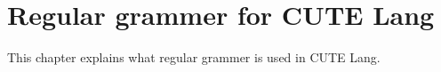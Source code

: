 \documentclass[a4paper, article, oneside]{memoir}
\begin{document}
\pagestyle{ruled}
\chapter{Regular grammer for CUTE Lang}
This chapter explains what regular grammer is used in CUTE Lang.
\end{document}
